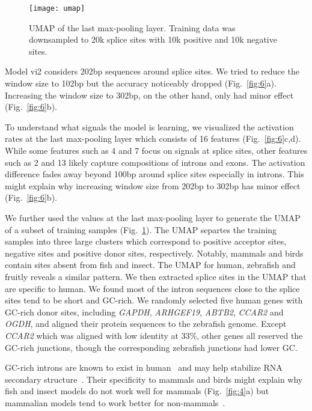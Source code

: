 \documentclass[webpdf,contemporary,large,namedate]{oup-authoring-template}%
\begin{document}
\begin{figure}[bt]
\texttt{[image: umap]}
\caption{UMAP of the last max-pooling layer.
Training data was downsampled to 20k splice sites with 10k positive and 10k negative sites.
}\label{fig:umap}
\end{figure}

Model vi2 considers 202bp sequences around splice sites.
We tried to reduce the window size to 102bp but the accuracy noticeably dropped (Fig.~\ref{fig:6}a).
Increasing the window size to 302bp, on the other hand, only had minor effect (Fig.~\ref{fig:6}b).

To understand what signals the model is learning, we visualized the activation rates at the last max-pooling layer which consists of 16 features (Fig.~\ref{fig:6}c,d).
While some features such as 4 and 7 focus on signals at splice sites,
other features such as 2 and 13 likely capture compositions of introns and exons.
The activation difference fades away beyond 100bp around splice sites especially in introns.
This might explain why increasing window size from 202bp to 302bp has minor effect (Fig.~\ref{fig:6}b).

We further used the values at the last max-pooling layer to generate the UMAP of a subset of training samples (Fig.~\ref{fig:umap}).
The UMAP separtes the training samples into three large clusters which correspond to
positive acceptor sites, negative sites and positive donor sites, respectively.
Notably, mammals and birds contain sites absent from fish and insect.
The UMAP for human, zebrafish and fruitly reveals a similar pattern.
We then extracted splice sites in the UMAP that are specific to human.
We found most of the intron sequences close to the splice sites tend to be short and GC-rich.
We randomly selected five human genes with GC-rich donor sites, including \emph{GAPDH}, \emph{ARHGEF19}, \emph{ABTB2}, \emph{CCAR2} and \emph{OGDH},
and aligned their protein sequences to the zebrafish genome.
Except \emph{CCAR2} which was aligned with low identity at 33\%,
other genes all reserved the GC-rich junctions, though the corresponding zebrafish junctions had lower GC.

GC-rich introns are known to exist in human~\citep{Wang:2011aa}
and may help stabilize RNA secondary structure~\citep{Zhang:2011aa}.
Their specificity to mammals and birds might explain
why fish and insect models do not work well for mammals (Fig.~\ref{fig:4}a)
but mammalian models tend to work better for non-mammals~\citep{McCue:2024aa}.
\end{document}
